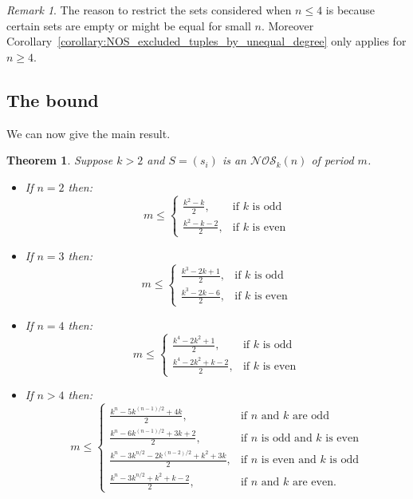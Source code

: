 \documentclass[a4paper,11pt]{article}
\theoremstyle{plain}
\newtheorem{theorem}[lemma]{Theorem}
\theoremstyle{definition}
\theoremstyle{remark}
\newtheorem{remark}{Remark}[section]
\begin{document}
\begin{remark}
The reason to restrict the sets considered when $n\leq 4$ is because certain sets are empty or
might be equal for small $n$.  Moreover
Corollary~\ref{corollary:NOS_excluded_tuples_by_unequal_degree} only applies for $n\geq4$.
\end{remark}

\subsection{The bound}

We can now give the main result.

\begin{theorem}  \label{theorem:new_NOS_bounds}
Suppose $k>2$ and $S=(s_i)$ is an $\mathcal{NOS}_k(n)$ of period $m$.
\begin{itemize}
\item[i)] If $n=2$ then:
\[ m \leq \begin{cases}
\frac{k^2-k}{2}, & \text{if $k$ is odd} \\
\frac{k^2-k-2}{2}, & \text{if $k$ is even}
\end{cases} \]
\item[ii)] If $n=3$ then:
\[ m \leq \begin{cases}
\frac{k^3-2k+1}{2}, & \text{if $k$ is odd} \\
\frac{k^3-2k-6}{2}, & \text{if $k$ is even}
\end{cases} \]
\item[iii)] If $n=4$ then:
\[ m \leq \begin{cases}
\frac{k^4-2k^2+1}{2}, & \text{if $k$ is odd} \\
\frac{k^4-2k^2+k-2}{2}, & \text{if $k$ is even}
\end{cases}\]
\item[iv)] If $n>4$ then:
\[ m \leq \begin{cases}
\frac{k^n-5k^{(n-1)/2}+4k}{2}, & \text{if $n$ and $k$ are odd} \\
\frac{k^n-6k^{(n-1)/2}+3k+2}{2}, & \text{if $n$ is odd and $k$ is even} \\
\frac{k^n-3k^{n/2}-2k^{(n-2)/2}+k^2+3k}{2}, & \text{if $n$ is even and $k$ is odd} \\
\frac{k^n-3k^{n/2}+k^2+k-2}{2}, & \text{if $n$ and $k$ are even.}
\end{cases}\]
\end{itemize}
\end{theorem}
\end{document}

